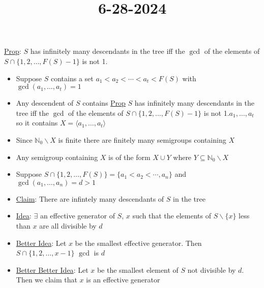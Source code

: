 \documentclass[11pt]{article}
\title{6-28-2024}
\date{}
\newcommand{\N}{{\mathbb N}}
\begin{document}
\maketitle
\underline{Prop}: $S$ has infinitely many descendants in the tree iff the $\gcd$ of the elements of $S\cap \{1,2,\dots,F(S)-1\}$ is not 1.
\begin{itemize}
    \item Suppose $S$ contains a set $a_1<a_2<\cdots<a_t<F(S)$ with $\gcd(a_1,\dots,a_t)=1$
    \item Any descendent of $S$ contains \underline{Prop} $S$ has infinitely many descendants in the tree iff the $\gcd$ of the elements of $S\cap \{1,2,\dots,F(S)-1\}$ is not 1.$a_1,\dots,a_t$ so it contains $X=\langle a_1,\dots,a_t\rangle$
    \item Since $\N_0\backslash X$ is finite there are finitely many semigroups containing $X$
    \item Any semigroup containing $X$ is of the form $X\cup Y$ where $Y\subseteq \N_0\backslash X$
    \item Suppose $S\cap\{1,2,\dots,F(S)\}=\{a_1<a_2<\cdots,a_n\}$ and $\gcd(a_1,\dots,a_n)=d>1$
    \item \underline{Claim}: There are infintely many descendants of $S$ in the tree
    \item \underline{Idea}: $\exists$ an effective generator of $S$, $x$ such that the elements of $S\backslash\{x\}$ less than $x$ are all divisible by $d$
    \item\underline{Better Idea}: Let $x$ be the smallest effective generator. Then $S\cap\{1,2,\dots,x-1\}$ $\gcd$ is $d$
    \item\underline{Better Better Idea}: Let $x$ be the smallest element of $S$ not divisible by $d$. Then we claim that $x$ is an effective generator
\end{itemize}
\end{document}
